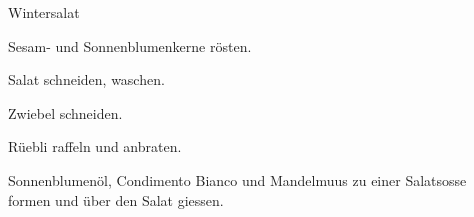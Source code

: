 
\begin{recipe}[]{Wintersalat}{}{}




\step
Sesam- und Sonnenblumenkerne r\"osten.


\step
Salat schneiden, waschen.


\step
Zwiebel schneiden.

\step
R\"uebli raffeln und anbraten.

\step
Sonnenblumen\"ol, Condimento Bianco und Mandelmuus zu einer Salatsosse formen und \"uber den Salat giessen.

\end{recipe}
